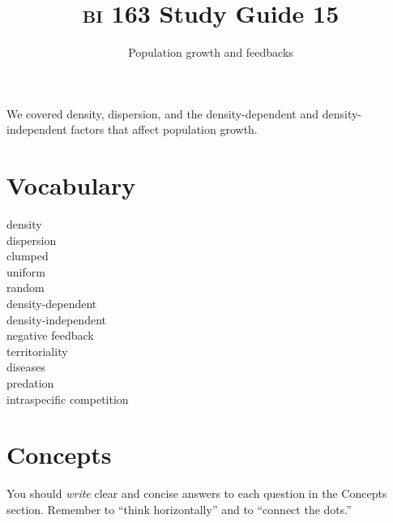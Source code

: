 \documentclass[letterpaper]{tufte-handout}
\title{{\scshape bi} 163 Study Guide 15}
\author{Population growth and feedbacks}
\date{} %
\begin{document}
\maketitle	%

We covered density, dispersion, and the density-dependent and density-independent factors that affect population growth.

\section*{Vocabulary}

\vspace{-1\baselineskip}
\begin{multicols}{2}
density \\
dispersion \\
clumped \\
uniform \\
random \\
density-dependent\\
density-independent\\
negative feedback\\
territoriality\\
diseases\\
predation\\
intraspecific competition
\end{multicols}

\section*{Concepts}

You should \emph{write} clear and concise answers to each question in the Concepts section.  Remember to ``think horizontally'' and to ``connect the dots.'' 
\end{document}
